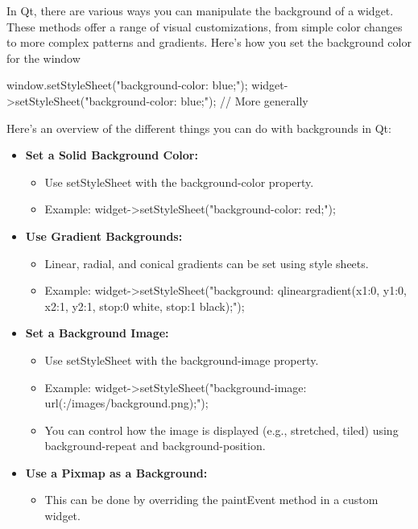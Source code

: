 \documentclass{report}
\begin{document}
    \pagebreak
    \bigbreak \noindent 
    In Qt, there are various ways you can manipulate the background of a widget. These methods offer a range of visual customizations, from simple color changes to more complex patterns and gradients. Here's how you set the background color for the window
    \bigbreak \noindent 
    \begin{cppcode}
    window.setStyleSheet("background-color: blue;");
    widget->setStyleSheet("background-color: blue;"); // More generally
    \end{cppcode}
    \bigbreak \noindent 
    Here's an overview of the different things you can do with backgrounds in Qt:
    \begin{itemize}
        \item \textbf{Set a Solid Background Color:}
            \begin{itemize}
                \item Use setStyleSheet with the background-color property.
                \item Example: widget->setStyleSheet("background-color: red;");
            \end{itemize}
        \item \textbf{Use Gradient Backgrounds:}
            \begin{itemize}
                \item Linear, radial, and conical gradients can be set using style sheets.
                \item Example: widget->setStyleSheet("background: qlineargradient(x1:0, y1:0, x2:1, y2:1, stop:0 white, stop:1 black);");
            \end{itemize}
        \item \textbf{Set a Background Image:}
            \begin{itemize}
                \item Use setStyleSheet with the background-image property.
                \item Example: widget->setStyleSheet("background-image: url(:/images/background.png);");
                \item You can control how the image is displayed (e.g., stretched, tiled) using background-repeat and background-position.
            \end{itemize}
        \item \textbf{Use a Pixmap as a Background:}
            \begin{itemize}
                \item This can be done by overriding the paintEvent method in a custom widget.

\end{itemize}
\end{itemize}
\end{document}
